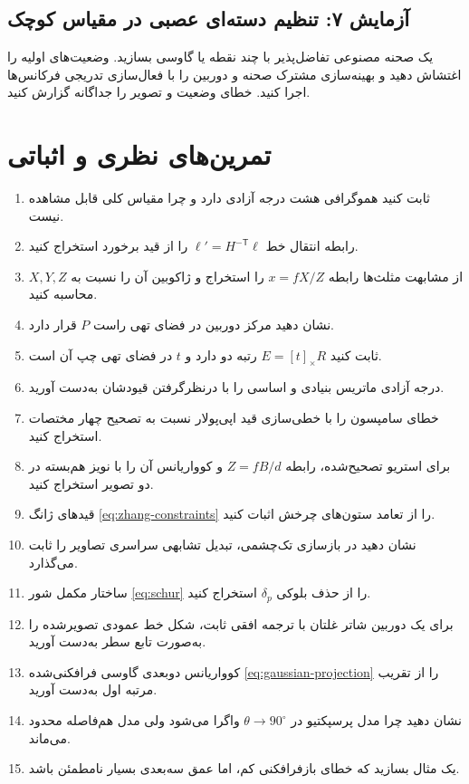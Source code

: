 \documentclass[12pt,openany,oneside]{book}
\begin{document}
\subsection{آزمایش ۷: تنظیم دسته‌ای عصبی در مقیاس کوچک}
یک صحنه مصنوعی تفاضل‌پذیر با چند نقطه یا گاوسی بسازید. وضعیت‌های اولیه را اغتشاش دهید و بهینه‌سازی مشترک صحنه و دوربین را
با فعال‌سازی تدریجی فرکانس‌ها اجرا کنید. خطای وضعیت و تصویر را جداگانه گزارش کنید.

\section{تمرین‌های نظری و اثباتی}

\begin{enumerate}
\item ثابت کنید هموگرافی هشت درجه آزادی دارد و چرا مقیاس کلی قابل مشاهده نیست.
\item رابطه انتقال خط \(\ell'=H^{-\mathsf T}\ell\) را از قید برخورد استخراج کنید.
\item از مشابهت مثلث‌ها رابطه \(x=fX/Z\) را استخراج و ژاکوبین آن را نسبت به \(X,Y,Z\) محاسبه کنید.
\item نشان دهید مرکز دوربین در فضای تهی راست \(P\) قرار دارد.
\item ثابت کنید \(E=[t]_\times R\) رتبه دو دارد و \(t\) در فضای تهی چپ آن است.
\item درجه آزادی ماتریس بنیادی و اساسی را با درنظرگرفتن قیودشان به‌دست آورید.
\item خطای سامپسون را با خطی‌سازی قید اپی‌پولار نسبت به تصحیح چهار مختصات استخراج کنید.
\item برای استریو تصحیح‌شده، رابطه \(Z=fB/d\) و کوواریانس آن را با نویز هم‌بسته در دو تصویر استخراج کنید.
\item قیدهای ژانگ \eqref{eq:zhang-constraints} را از تعامد ستون‌های چرخش اثبات کنید.
\item نشان دهید در بازسازی تک‌چشمی، تبدیل تشابهی سراسری تصاویر را ثابت می‌گذارد.
\item ساختار مکمل شور \eqref{eq:schur} را از حذف بلوکی \(\delta_p\) استخراج کنید.
\item برای یک دوربین شاتر غلتان با ترجمه افقی ثابت، شکل خط عمودی تصویرشده را به‌صورت تابع سطر به‌دست آورید.
\item کوواریانس دوبعدی گاوسی فرافکنی‌شده \eqref{eq:gaussian-projection} را از تقریب مرتبه اول به‌دست آورید.
\item نشان دهید چرا مدل پرسپکتیو در \(\theta\to90^\circ\) واگرا می‌شود ولی مدل هم‌فاصله محدود می‌ماند.
\item یک مثال بسازید که خطای بازفرافکنی کم، اما عمق سه‌بعدی بسیار نامطمئن باشد.
\end{enumerate}
\end{document}
